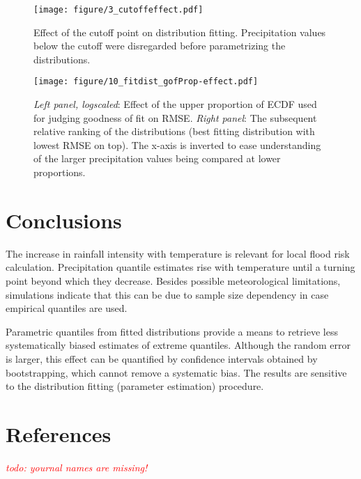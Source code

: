 \documentclass[a4paper]{article}
\newcommand{\todo}[1]{\emph{\textcolor{red}{#1}}}
\begin{document}
\begin{figure}[H] %
\texttt{[image: figure/3\_cutoffeffect.pdf]}
\caption[Threshold effect on distribution]{Effect of the cutoff point on distribution fitting. Precipitation values below the cutoff were disregarded before parametrizing the distributions.}
\label{fig:cutoffeffect1}
\end{figure}

\begin{figure}[H] %
\texttt{[image: figure/10\_fitdist\_gofProp-effect.pdf]}
\caption[Effect of GOF-focus on dist selection]{\textit{Left panel, logscaled}: Effect of the upper proportion of ECDF used for judging goodness of fit on RMSE. \textit{Right panel}: The subsequent relative ranking of the distributions (best fitting distribution with lowest RMSE on top). The x-axis is inverted to ease understanding of the larger precipitation values being compared at lower proportions.}
\label{fig:gofPropeffect}
\end{figure}


\pagebreak
\section{Conclusions} %

\begin{multicols}{2}
The increase in rainfall intensity with temperature is relevant for local flood risk calculation.
Precipitation quantile estimates rise with temperature until a turning point beyond which they decrease.
Besides possible meteorological limitations, simulations indicate that this can be due to sample size dependency in case empirical quantiles are used. 

Parametric quantiles from fitted distributions provide a means to retrieve less systematically biased estimates of extreme quantiles. 
Although the random error is larger, this effect can be quantified by confidence intervals obtained by bootstrapping, which cannot remove a systematic bias.
The results are sensitive to the distribution fitting (parameter estimation) procedure.
\end{multicols}


\section{References} %

\todo{todo: yournal names are missing!}

\begin{multicols}{2}
\printbibliography[heading=none]
\end{multicols}
\end{document}
